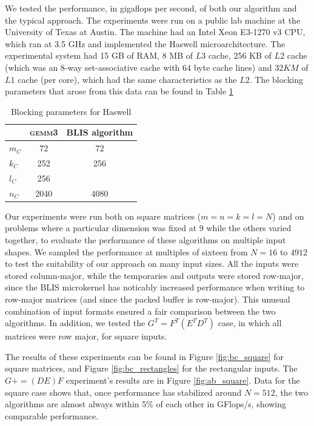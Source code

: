 \documentclass[12pt]{article}
\newcommand*{\pluseq}{\mathrel{{+}{=}}}
\newcommand*{\gemmt}{{\textsc{gemm3}}}
\begin{document}
We tested the performance, in gigaflops per second, of both our algorithm and the typical approach.
The experiments were run on a public lab machine at the University of Texas at Austin.
The machine had an Intel Xeon E3-1270 v3 CPU, which ran at 3.5 GHz and implemented the Haswell microarchitecture.
The experimental system had 15 GB of RAM, 8 MB of $L3$ cache, 256 KB of $L2$ cache (which was an 8-way set-associative cache with 64 byte cache lines) and $32 KM$ of $L1$ cache (per core), which had the same characteristics as the $L2$.
The blocking parameters that arose from this data can be found in Table \ref{tab:parameters}

\begin{table}
  \centering
  \begin{tabular}{l|c c}
    &\gemmt{}&BLIS algorithm\\ \hline
    $m_C$&72&72\\
    $k_C$&252&256\\
    $l_C$&256&\\
    $n_C$&2040&4080\\
  \end{tabular}
  \caption{Blocking parameters for Haswell}
  \label{tab:parameters}
\end{table}

Our experiments were run both on square matrices ($m = n = k = l = N$) and on problems where a particular dimension was fixed at $9$ while the others varied together, to evaluate the performance of these algorithms on multiple input shapes.
We sampled the performance at multiples of sixteen from $N = 16$ to $4912$ to test the suitability of our approach on many input sizes.
All the inputs were stored column-major, while the temporaries and outputs were stored row-major, since the BLIS microkernel has noticably increased performance when writing to row-major matrices (and since the packed buffer is row-major).
This unusual combination of input formats ensured a fair comparison between the two algorithms.
In addition, we tested the $G^T = F^T(E^TD^T)$ case, in which all matrices were row major, for square inputs.

The results of these experiments can be found in Figure \ref{fig:bc_square} for square matrices, and Figure \ref{fig:bc_rectangles} for the rectangular inputs.
The $G \pluseq (DE)F$ experiment's results are in Figure \ref{fig:ab_square}.
Data for the square case shows that, once performance has stabilized around $N = 512$, the two algorithms are almost always within 5\% of each other in GFlops/s, showing comparable performance.
\end{document}
